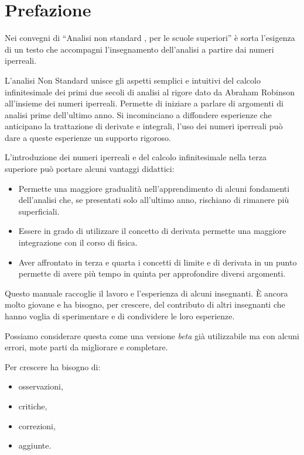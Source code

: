 \pagestyle{matc3page}
\chapter*{Prefazione}

Nei convegni di ``Analisi non standard , per le scuole superiori'' è sorta 
l'esigenza di un testo che accompagni l'insegnamento dell'analisi a partire dai 
numeri iperreali.

L'analisi Non Standard unisce gli aspetti semplici e intuitivi del 
calcolo infinitesimale dei primi due secoli di analisi al rigore dato da 
Abraham Robinson all'insieme dei numeri iperreali.
Permette di iniziare a parlare di argomenti di analisi prime dell'ultimo anno.
Si incominciano a diffondere esperienze che anticipano la trattazione di 
derivate e integrali, l'uso dei numeri iperreali può dare a queste esperienze 
un supporto rigoroso.

L'introduzione dei numeri iperreali e del calcolo infinitesimale nella terza 
superiore può portare alcuni vantaggi didattici:
\begin{itemize} [nosep]
\item Permette una maggiore gradualità nell'apprendimento di alcuni fondamenti 
dell'analisi che, se presentati solo all'ultimo anno, 
rischiano di rimanere più superficiali.
\item Essere in grado di utilizzare il concetto di derivata permette una 
maggiore integrazione con il corso di fisica.
\item Aver affrontato in terza e quarta i concetti di limite e di derivata in 
un punto permette di avere più tempo in quinta per approfondire diversi 
argomenti.
\end{itemize}

Questo manuale raccoglie il lavoro e l'esperienza di alcuni insegnanti. È 
ancora molto giovane e ha bisogno, per crescere, del contributo di altri 
insegnanti che hanno voglia di sperimentare e di condividere le loro esperienze.

Possiamo considerare questa come una versione \emph{beta} già utilizzabile ma 
con alcuni errori, mote parti da migliorare e completare. 

Per crescere ha bisogno di:
\begin{itemize} [nosep]
\item osservazioni,
\item critiche,
\item correzioni,
\item aggiunte.
\end{itemize}

